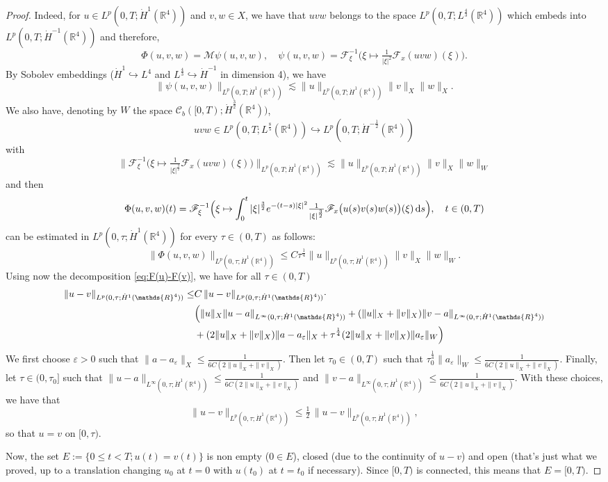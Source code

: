 \documentclass[a4paper, 12pt]{article}
\theoremstyle{plain}
\theoremstyle{definition}
\theoremstyle{remark}
\numberwithin{equation}{section}
\begin{document}
\begin{proof}
\noindent
Indeed, for 
$u\in L^p(0,T;\dot H^1({\mathds{R}}^4))$ and $v,w\in X$, we have that $uvw$ belongs to the space
$L^p(0,T; L^{\frac{4}{3}}({\mathds{R}}^4))$ which embeds into
$L^p(0,T; \dot H^{-1}({\mathds{R}}^4))$ and therefore,
\[
\Phi(u,v,w) ={\mathscr{M}} \psi(u,v,w), \quad \psi(u,v,w)={\mathscr{F}}_\xi^{-1}\bigl(\xi\mapsto \tfrac{1}{|\xi|^2}{\mathscr{F}}_x(uvw)(\xi)\bigr).
\]
By Sobolev embeddings ($\dot H^1\hookrightarrow L^4$ and $L^{\frac{4}{3}}\hookrightarrow \dot H^{-1}$ in dimension 4), we have
\[
\bigl\|\psi(u,v,w)\bigr\|_{L^p(0,T;\dot H^1({\mathds{R}}^4))}\lesssim \|u\|_{L^p(0,T;\dot H^1({\mathds{R}}^4))}\|v\|_{X}\|w\|_{X}.
\]
We also have, denoting by $W$ the space ${\mathscr{C}}_b([0,T);\dot H^{\frac{3}{2}}({\mathds{R}}^4))$, 
\[
uvw\in L^p(0,T;L^{\frac{8}{5}}({\mathds{R}}^4))\hookrightarrow L^p(0,T;\dot H^{-\frac{1}{2}}({\mathds{R}}^4))
\]
with
\[
\|{\mathscr{F}}_\xi^{-1}\bigl(\xi\mapsto \tfrac{1}{|\xi|^{\frac{3}{2}}}{\mathscr{F}}_x(uvw)(\xi)\bigr)\|_{L^p(0,T;\dot H^{1}({\mathds{R}}^4))}
\lesssim \|u\|_{L^p(0,T;\dot H^1({\mathds{R}}^4))}\|v\|_X\|w\|_W
\]
and then
\[
\Phi(u,v,w)(t)={\mathscr{F}}_\xi^{-1}\Bigl(\xi\mapsto \int_0^t |\xi|^{\frac{3}{2}}e^{-(t-s)|\xi|^2}
\tfrac{1}{|\xi|^{\frac{3}{2}}}{\mathscr{F}}_x\bigl(u(s)v(s)w(s)\bigr)(\xi) \,{\rm d}s\Bigr), \quad t\in (0,T)
\]
can be estimated in $L^p(0,\tau;\dot H^1({\mathds{R}}^4))$ for every $\tau \in (0,T)$ as follows:
\[
\bigl\|\Phi(u,v,w)\bigr\|_{L^p(0,\tau;\dot H^1({\mathds{R}}^4))}\le C \tau^{\frac{1}{4}}\|u\|_{L^p(0,\tau;\dot H^1({\mathds{R}}^4))}\|v\|_X\|w\|_W.
\]
Using now the decomposition \eqref{eq:F(u)-F(v)}, we have for all $\tau\in (0,T)$
%
\begin{align*}
\|u-v\|_{L^p(0,\tau;\dot H^1({\mathds{R}}^4))}\le  &C \,\|u-v\|_{L^p(0,\tau;\dot H^1({\mathds{R}}^4))}\cdot\\
&\Bigl( \|u\|_X\|u-a\|_{L^\infty(0,\tau;\dot H^1({\mathds{R}}^4))}  +(\|u\|_X+\|v\|_X)\|v-a\|_{L^\infty(0,\tau;\dot H^1({\mathds{R}}^4))} \\
&+ (2\|u\|_X+\|v\|_X)\|a-a_\varepsilon\|_X+\tau^{\frac{1}{4}}(2\|u\|_X+\|v\|_X)\|a_\varepsilon\|_W \Bigr)
\end{align*}
%
We first choose $\varepsilon>0$ such that $\|a-a_\varepsilon\|_X\le \frac{1}{6C(2\|u\|_X+\|v\|_X)}$. Then let $\tau_0\in(0,T)$ such that
$\tau_0^{\frac{1}{4}}\|a_\varepsilon\|_W\le \frac{1}{6C(2\|u\|_X+\|v\|_X)}$. Finally, let $\tau\in (0,\tau_0]$ such that 
$\|u-a\|_{L^\infty(0,\tau;\dot H^1({\mathds{R}}^4))}\le \frac{1}{6C(2\|u\|_X+\|v\|_X)}$ and 
$\|v-a\|_{L^\infty(0,\tau;\dot H^1({\mathds{R}}^4))}\le \frac{1}{6C(2\|u\|_X+\|v\|_X)}$. With these choices, we have that
\[
\|u-v\|_{L^p(0,\tau;\dot H^1({\mathds{R}}^4))}\le \tfrac{1}{2}\,\|u-v\|_{L^p(0,\tau;\dot H^1({\mathds{R}}^4))},
\]
so that $u=v$ on $[0,\tau)$.

\noindent
Now, the set $E:=\{0\le t <T; u(t)=v(t)\}$ is non empty ($0\in E$), closed (due to the continuity of $u-v$) and open (that's just what we proved,
up to a translation changing $u_0$ at $t=0$ with $u(t_0)$ at $t=t_0$ if necessary). Since $[0,T)$ is connected, this means that $E=[0,T)$.
\end{proof}
\end{document}
